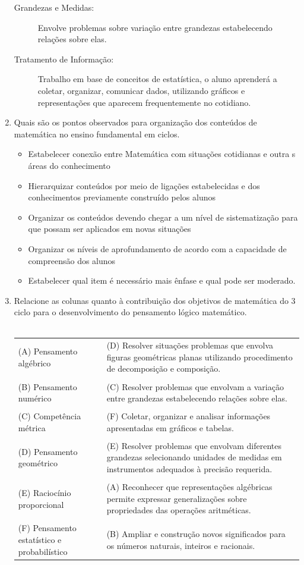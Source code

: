 \documentclass[a4paper, 12pt]{article}
\begin{document}
\begin{enumerate}
\begin{description}
   \item[Grandezas e Medidas:] Envolve problemas sobre variação entre grandezas estabelecendo relações sobre elas.
   \item[Tratamento de Informação:] Trabalho em base de conceitos de estatística, o aluno aprenderá a coletar, organizar, comunicar dados, utilizando gráficos e representações que aparecem frequentemente no cotidiano.
   \end{description}
 \item Quais são os pontos observados para organização dos conteúdos de matemática no ensino fundamental em ciclos.
   \begin{itemize}
   \item Estabelecer conexão entre Matemática com situações cotidianas e outra s áreas do conhecimento
   \item Hierarquizar conteúdos por meio de ligações estabelecidas e dos conhecimentos previamente construído pelos alunos
   \item Organizar os conteúdos devendo chegar a um nível de sistematização para que possam ser aplicados em novas situações
   \item Organizar os níveis de aprofundamento de acordo com a capacidade de compreensão dos alunos
   \item Estabelecer qual item é necessário mais ênfase e qual pode ser moderado.
   \end{itemize}
\item Relacione as colunas quanto à contribuição dos objetivos de matemática do 3 ciclo para o desenvolvimento do pensamento lógico matemático. \\ \\
  \begin{tabular}{m{5cm} m{5cm}}
    (A) Pensamento algébrico & (D) Resolver situações problemas que envolva figuras geométricas planas utilizando procedimento de decomposição e composição. \\ \\
    (B) Pensamento numérico & (C) Resolver problemas que envolvam a variação entre grandezas estabelecendo relações sobre elas. \\ \\
    (C) Competência métrica & (F) Coletar, organizar e analisar informações apresentadas em gráficos e tabelas. \\ \\
    (D) Pensamento geométrico & (E) Resolver problemas que envolvam diferentes grandezas selecionando unidades de medidas em instrumentos adequados à precisão requerida. \\ \\
    (E) Raciocínio proporcional & (A) Reconhecer que representações algébricas permite expressar generalizações sobre propriedades das operações aritméticas. \\ \\
    (F) Pensamento estatístico e probabilístico & (B) Ampliar e construção novos significados para os números naturais, inteiros e racionais.
  \end{tabular}
\end{enumerate}
\end{document}
